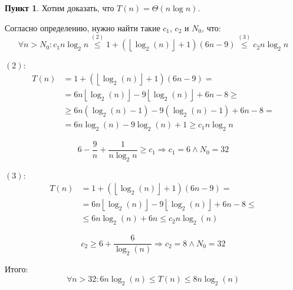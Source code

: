 \documentclass[11pt,a4paper]{scrarticle}
\theoremstyle{definition}
\newtheorem{subtask}{Пункт}
\begin{document}
\begin{subtask}
	Хотим доказать, что $T(n) = \Theta(n \log n)$.

	Согласно определению, нужно найти такие $c_{1}$, $c_{2}$ и $N_{0}$, что:
	$$
		\forall n > N_0 \colon c_{1} n \log_2 n \overset{(2)}{\le}
		1 + (\left\lfloor \log_2(n) \right\rfloor + 1) (6n - 9)
		\overset{(3)}{\le} c_{2} n \log_2 n
	$$

	$(2)$:
	\begin{align*}
		T(n) & = 1 + (\left\lfloor \log_2(n) \right\rfloor + 1) (6n - 9) =                                     \\
		     & = 6n \left\lfloor \log_2(n) \right\rfloor - 9 \left\lfloor \log_2(n) \right\rfloor + 6n - 8 \ge \\
		     & \ge 6n (\log_2(n) - 1) - 9 (\log_2(n) - 1) + 6n - 8 =                                           \\
		     & = 6n \log_2(n) - 9 \log_2(n) + 1 \ge c_{1} n \log_2 n
	\end{align*}

	$$
		6 - \frac{9}{n} + \frac{1}{n \log_2 n} \ge c_{1} \Rightarrow c_{1} = 6 \wedge N_{0} = 32
	$$
	\pagebreak

	$(3)$:
	\begin{align*}
		T(n) & = 1 + (\left\lfloor \log_2(n) \right\rfloor + 1) (6n - 9) =                                     \\
		     & = 6n \left\lfloor \log_2(n) \right\rfloor - 9 \left\lfloor \log_2(n) \right\rfloor + 6n - 8 \le \\
		     & \le 6n \log_2(n) + 6n \le c_{2} n \log_2(n)
	\end{align*}

	$$
		c_2 \ge 6 + \frac{6}{\log_2(n)} \Rightarrow c_{2} = 8 \wedge N_{0} = 32
	$$

	Итого:
	$$
		\forall n > 32 \colon 6 n \log_2(n) \le T(n) \le 8 n \log_2(n)
	$$
\end{subtask}
\end{document}
